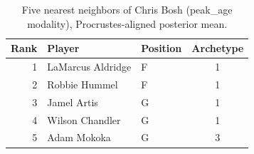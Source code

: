 \begin{table}[htbp]
  \centering\small
  \begin{tabular}{rllc}
    \toprule
    Rank & Player & Position & Archetype \\
    \midrule
    1 & LaMarcus Aldridge & F & 1 \\
    2 & Robbie Hummel & F & 1 \\
    3 & Jamel Artis & G & 1 \\
    4 & Wilson Chandler & G & 1 \\
    5 & Adam Mokoka & G & 3 \\
    \bottomrule
  \end{tabular}
  \caption{Five nearest neighbors of Chris Bosh (peak_age modality), Procrustes-aligned posterior mean.}
  \label{tab:Chris_Bosh_neighbors_peak_age}
\end{table}

